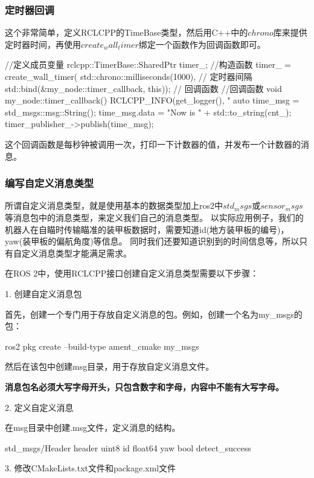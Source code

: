 \subsubsection{定时器回调}
这个非常简单，定义RCLCPP的TimeBase类型，然后用C++中的$chrono$库来提供定时器时间，再使用$create_wall_timer$绑定一个函数作为回调函数即可。
\begin{tcode}
    //定义成员变量
    rclcpp::TimerBase::SharedPtr timer_;
    //构造函数
    timer_ = create_wall_timer(
        std::chrono::milliseconds(1000), // 定时器间隔
        std::bind(&my_node::timer_callback, this)); // 回调函数
    //回调函数
    void my_node::timer_callback()
    {
        RCLCPP_INFO(get_logger(), "%
        auto time_msg = std_msgs::msg::String();
        time_msg.data = "Now is " + std::to_string(cnt_);
        timer_publisher_->publish(time_msg);
    }
\end{tcode}
这个回调函数是每秒钟被调用一次，打印一下计数器的值，并发布一个计数器的消息。

\subsubsection{编写自定义消息类型}
所谓自定义消息类型，就是使用基本的数据类型加上ros2中$std_msgs$或$sensor_msgs$等消息包中的消息类型，来定义我们自己的消息类型。
以实际应用例子，我们的机器人在自瞄时传输瞄准的装甲板数据时，需要知道id(地方装甲板的编号)，yaw(装甲板的偏航角度)等信息。
同时我们还要知道识别到的时间信息等，所以只有自定义消息类型才能满足需求。


在ROS 2中，使用RCLCPP接口创建自定义消息类型需要以下步骤：

1. 创建自定义消息包

首先，创建一个专门用于存放自定义消息的包。例如，创建一个名为my\_msgs的包：
\begin{tbash}
    ros2 pkg create --build-type ament_cmake my_msgs
\end{tbash}

然后在该包中创建msg目录，用于存放自定义消息文件。

\textbf{消息包名必须大写字母开头，只包含数字和字母，内容中不能有大写字母。}

2. 定义自定义消息

在msg目录中创建.msg文件，定义消息的结构。
\begin{tbash}
    std_msgs/Header header
    uint8 id
    float64 yaw
    bool detect_success
\end{tbash}

3. 修改CMakeLists.txt文件和package.xml文件

